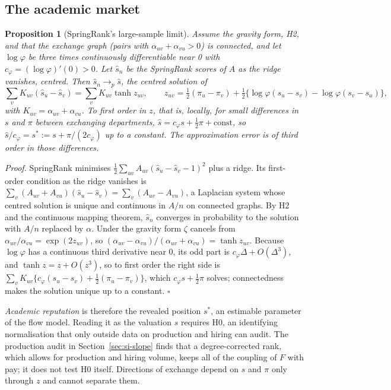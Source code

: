 \documentclass[11pt]{article}
\newtheorem{sprop}{Proposition}
\newcommand{\qedsq}{\hfill$\square$}
\begin{document}
\subsection{The academic market}

\begin{sprop}[SpringRank's large-sample limit]\label{prop:springrank}
Assume the gravity form, H2, and that the exchange graph (pairs with $\alpha_{uv}+\alpha_{vu}>0$) is connected, and
let $\log\varphi$ be three times continuously differentiable near 0 with $c_\varphi=(\log\varphi)'(0)>0$. Let
$\hat s_n$ be the SpringRank scores \citep{debacco2018physical} of $A$ as the ridge vanishes, centred. Then $\hat
s_n\to_p\hat s$, the centred solution of
\[
\textstyle\sum_vK_{uv}(\hat s_u-\hat s_v)=\sum_vK_{uv}\tanh z_{uv},\qquad
z_{uv}=\tfrac12(\pi_u-\pi_v)+\tfrac12\{\log\varphi(s_u-s_v)-\log\varphi(s_v-s_u)\},
\]
with $K_{uv}=\alpha_{uv}+\alpha_{vu}$. To first order in $z$, that is, locally, for small differences in $s$ and
$\pi$ between exchanging departments, $\hat s=c_\varphi s+\tfrac12\pi+\text{const}$, so $\hat
s/c_\varphi=s^*:=s+\pi/(2c_\varphi)$ up to a constant. The approximation error is of third order in those
differences.
\end{sprop}

\emph{Proof.} SpringRank minimises $\tfrac12\sum_{uv}A_{uv}(\hat s_u-\hat s_v-1)^2$ plus a ridge. Its first-order
condition as the ridge vanishes is $\sum_v(A_{uv}+A_{vu})(\hat s_u-\hat s_v)=\sum_v(A_{uv}-A_{vu})$, a Laplacian
system whose centred solution is unique and continuous in $A/n$ on connected graphs. By H2 and the continuous
mapping theorem, $\hat s_n$ converges in probability to the solution with $A/n$ replaced by $\alpha$. Under the
gravity form $\zeta$ cancels from $\alpha_{uv}/\alpha_{vu}=\exp(2z_{uv})$, so
$(\alpha_{uv}-\alpha_{vu})/(\alpha_{uv}+\alpha_{vu})=\tanh z_{uv}$. Because $\log\varphi$ has a continuous third
derivative near 0, its odd part is $c_\varphi\Delta+O(\Delta^3)$, and $\tanh z=z+O(z^3)$, so to first order the
right side is
$\sum_vK_{uv}\{c_\varphi(s_u-s_v)+\tfrac12(\pi_u-\pi_v)\}$, which $c_\varphi s+\tfrac12\pi$ solves; connectedness makes
the solution unique up to a constant. \qedsq

\emph{Academic reputation} is therefore the revealed position $s^*$, an estimable parameter of the flow model.
Reading it as the valuation $s$ requires H0, an identifying normalisation that only outside data on production and
hiring can audit. The production audit in Section~\ref{sec:si-slope} finds that a degree-corrected rank, which
allows for production and hiring volume, keeps all of the coupling of $F$ with pay; it does not test H0 itself.
Directions of exchange depend on $s$ and $\pi$ only through $z$ and cannot separate them.
\end{document}
